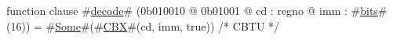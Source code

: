 function clause #\hyperref[zdecode]{decode}# (0b010010 @ 0b01001 @ cd : regno @ imm : #\hyperref[zbits]{bits}#(16)) = #\hyperref[zSome]{Some}#(#\hyperref[zCBX]{CBX}#(cd, imm, true))  /* CBTU */
